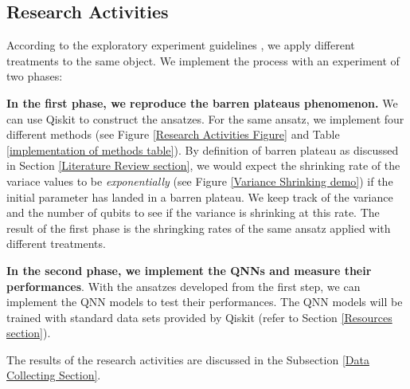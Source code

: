 \subsection{Research Activities} \label{Research Activities section}
According to the exploratory experiment guidelines \cite{wohlinExperimentationSoftwareEngineering2012}, we apply different treatments to the same object.
We implement the process with an experiment of two phases:

\textbf{In the first phase, we reproduce the barren plateaus phenomenon.}
We can use Qiskit \cite{Qiskit} to construct the ansatzes.
For the same ansatz, we implement four different methods (see Figure \ref{Research Activities Figure} and Table \ref{implementation of methods table}).
By definition of barren plateau as discussed in Section \ref{Literature Review section}, we would expect the shrinking rate of the variace values to be \textit{exponentially} (see Figure \ref{Variance Shrinking demo}) if the initial parameter has landed in a barren plateau.
We keep track of the variance and the number of qubits to see if the variance is shrinking at this rate.
The result of the first phase is the shringking rates of the same ansatz applied with different treatments.

\textbf{In the second phase, we implement the QNNs and measure their performances}.
With the ansatzes developed from the first step, we can implement the QNN models to test their performances.
The QNN models will be trained with standard data sets provided by Qiskit (refer to Section \ref{Resources section}).

The results of the research activities are discussed in the Subsection \ref{Data Collecting Section}.

